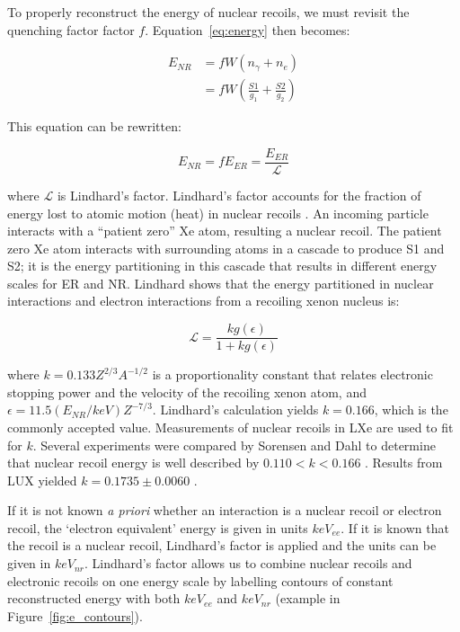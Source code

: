 To properly reconstruct the energy of nuclear recoils, we must revisit the quenching factor factor $f$. Equation~\ref{eq:energy} then becomes:

 \begin{equation}
 \begin{split}
E_{NR} &= f W (n_{\gamma} + n_{e} ) \\
   &= f W (\frac{S1}{g_{1}} + \frac{S2}{g_{2}})
 \end{split}
\end{equation}

This equation can be rewritten:

 \begin{equation}
 \label{eq:combined_energy}
E_{NR} = f E_{ER} = \frac{E_{ER}}{\mathcal{L}}
\end{equation}

where $\mathcal{L}$ is Lindhard's factor. Lindhard's factor accounts for the fraction of energy lost to atomic motion (heat) in nuclear recoils \cite{Lindhard1963}. An incoming particle interacts with a ``patient zero'' Xe atom, resulting a nuclear recoil. The patient zero Xe atom interacts with surrounding atoms in a cascade to produce S1 and S2; it is the energy partitioning in this cascade that results in different energy scales for \ac{ER} and \ac{NR}. Lindhard shows that the energy partitioned in nuclear interactions and electron interactions from a recoiling xenon nucleus is:

 \begin{equation}
 \label{eq:lindhard}
\mathcal{L} = \frac{k g(\epsilon)}{1 + k g(\epsilon)}
\end{equation}

where $k = 0.133 Z^{2/3} A^{-1/2}$ is a proportionality constant that relates electronic stopping power and the velocity of the recoiling xenon atom, and $\epsilon = 11.5 (E_{NR}/keV) Z^{-7/3}$. Lindhard's calculation yields $k=0.166$, which is the commonly accepted value. Measurements of nuclear recoils in \ac{LXe} are used to fit for $k$. Several experiments were compared by Sorensen and Dahl to determine that nuclear recoil energy is well described by $0.110 < k < 0.166$ \cite{Sorensen2011}. Results from \ac{LUX} yielded $k = 0.1735 \pm 0.0060$ \cite{LUXDD}. 


If it is not known \textit{a priori} whether an interaction is a nuclear recoil or electron recoil, the `electron equivalent' energy is given in units $keV_{ee}$. If it is known that the recoil is a nuclear recoil, Lindhard's factor is applied and the units can be given in $keV_{nr}$. Lindhard's factor allows us to combine nuclear recoils and electronic recoils on one energy scale by labelling contours of constant reconstructed energy with both $keV_{ee}$ and $keV_{nr}$ (example in Figure~\ref{fig:e_contours}).


